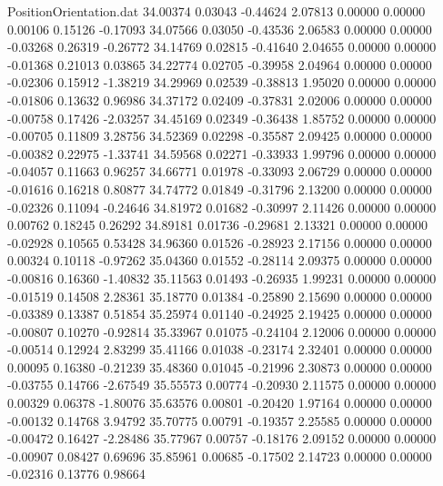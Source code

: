 \begin{filecontents}{PositionOrientation.dat}
  34.00374    0.03043   -0.44624     2.07813    0.00000    0.00000    0.00106    0.15126   -0.17093
  34.07566    0.03050   -0.43536     2.06583    0.00000    0.00000   -0.03268    0.26319   -0.26772
  34.14769    0.02815   -0.41640     2.04655    0.00000    0.00000   -0.01368    0.21013    0.03865
  34.22774    0.02705   -0.39958     2.04964    0.00000    0.00000   -0.02306    0.15912   -1.38219
  34.29969    0.02539   -0.38813     1.95020    0.00000    0.00000   -0.01806    0.13632    0.96986
  34.37172    0.02409   -0.37831     2.02006    0.00000    0.00000   -0.00758    0.17426   -2.03257
  34.45169    0.02349   -0.36438     1.85752    0.00000    0.00000   -0.00705    0.11809    3.28756
  34.52369    0.02298   -0.35587     2.09425    0.00000    0.00000   -0.00382    0.22975   -1.33741
  34.59568    0.02271   -0.33933     1.99796    0.00000    0.00000   -0.04057    0.11663    0.96257
  34.66771    0.01978   -0.33093     2.06729    0.00000    0.00000   -0.01616    0.16218    0.80877
  34.74772    0.01849   -0.31796     2.13200    0.00000    0.00000   -0.02326    0.11094   -0.24646
  34.81972    0.01682   -0.30997     2.11426    0.00000    0.00000    0.00762    0.18245    0.26292
  34.89181    0.01736   -0.29681     2.13321    0.00000    0.00000   -0.02928    0.10565    0.53428
  34.96360    0.01526   -0.28923     2.17156    0.00000    0.00000    0.00324    0.10118   -0.97262
  35.04360    0.01552   -0.28114     2.09375    0.00000    0.00000   -0.00816    0.16360   -1.40832
  35.11563    0.01493   -0.26935     1.99231    0.00000    0.00000   -0.01519    0.14508    2.28361
  35.18770    0.01384   -0.25890     2.15690    0.00000    0.00000   -0.03389    0.13387    0.51854
  35.25974    0.01140   -0.24925     2.19425    0.00000    0.00000   -0.00807    0.10270   -0.92814
  35.33967    0.01075   -0.24104     2.12006    0.00000    0.00000   -0.00514    0.12924    2.83299
  35.41166    0.01038   -0.23174     2.32401    0.00000    0.00000    0.00095    0.16380   -0.21239
  35.48360    0.01045   -0.21996     2.30873    0.00000    0.00000   -0.03755    0.14766   -2.67549
  35.55573    0.00774   -0.20930     2.11575    0.00000    0.00000    0.00329    0.06378   -1.80076
  35.63576    0.00801   -0.20420     1.97164    0.00000    0.00000   -0.00132    0.14768    3.94792
  35.70775    0.00791   -0.19357     2.25585    0.00000    0.00000   -0.00472    0.16427   -2.28486
  35.77967    0.00757   -0.18176     2.09152    0.00000    0.00000   -0.00907    0.08427    0.69696
  35.85961    0.00685   -0.17502     2.14723    0.00000    0.00000   -0.02316    0.13776    0.98664

\end{filecontents}
